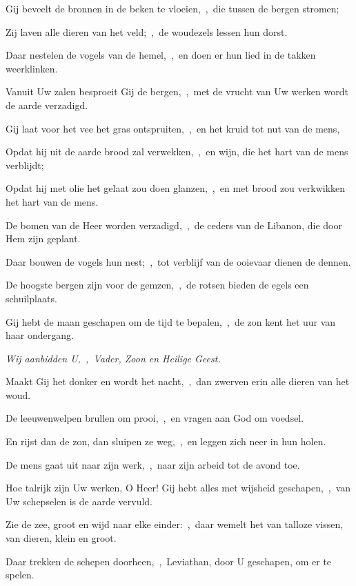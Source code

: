 \documentclass[12pt,twoside,a5paper]{article}
\begin{document}

\begin{halfparskip}
  Gij beveelt de bronnen in de beken te vloeien,~\sep\ die tussen de bergen stromen;

  Zij laven alle dieren van het veld;~\sep\ de woudezels lessen hun dorst.

  Daar nestelen de vogels van de hemel,~\sep\ en doen er hun lied in de takken weerklinken.

  Vanuit Uw zalen besproeit Gij de bergen,~\sep\ met de vrucht van Uw werken wordt de aarde verzadigd.

  Gij laat voor het vee het gras ontspruiten,~\sep\ en het kruid tot nut van de mens,

  Opdat hij uit de aarde brood zal verwekken,~\sep\ en wijn, die het hart van de mens verblijdt;

  Opdat hij met olie het gelaat zou doen glanzen,~\sep\ en met brood zou verkwikken het hart van de mens.

  De bomen van de Heer worden verzadigd,~\sep\ de ceders van de Libanon, die door Hem zijn geplant.

  Daar bouwen de vogels hun nest;~\sep\ tot verblijf van de ooievaar dienen de dennen.

  De hoogste bergen zijn voor de gemzen,~\sep\ de rotsen bieden de egels een schuilplaats.
\end{halfparskip}


\begin{halfparskip}
  Gij hebt de maan geschapen om de tijd te bepalen,~\sep\ de zon kent het uur van haar ondergang.

  \emph{Wij aanbidden U,~\sep\ Vader, Zoon en Heilige Geest.}

  Maakt Gij het donker en wordt het nacht,~\sep\ dan zwerven erin alle dieren van het woud.

  De leeuwenwelpen brullen om prooi,~\sep\ en vragen aan God om voedsel.

  En rijst dan de zon, dan sluipen ze weg,~\sep\ en leggen zich neer in hun holen.

  De mens gaat uit naar zijn werk,~\sep\ naar zijn arbeid tot de avond toe.

  Hoe talrijk zijn Uw werken, O Heer! Gij hebt alles met wijsheid geschapen,~\sep\ van Uw schepselen is de aarde vervuld.

  Zie de zee, groot en wijd naar elke einder:~\sep\ daar wemelt het van talloze vissen, van dieren, klein en groot.

  Daar trekken de schepen doorheen,~\sep\ Leviathan, door U geschapen, om er te spelen.
\end{halfparskip}
\end{document}
